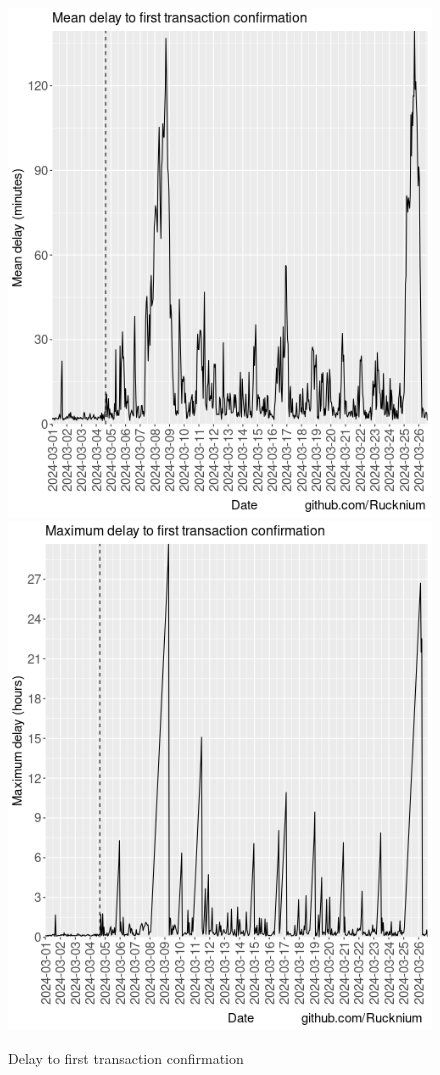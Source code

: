 \documentclass[usletter,11pt,english,openany]{article}
\begin{document}
\begin{figure}[H]
\caption{Delay to first transaction confirmation}
\label{fig-delay-tx-confirmation}
\centering{}\includegraphics[scale=0.5]{images/mean-delay-first-confirmation}\includegraphics[scale=0.5]{images/max-delay-first-confirmation}
\end{figure}
\end{document}
